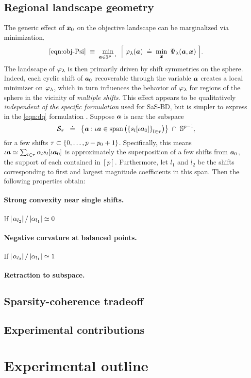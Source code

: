 \documentclass{article}
\numberwithin{equation}{section}
\begin{document}
\subsection{Regional landscape geometry}
The generic effect of $\boldsymbol{x}_0$ on the objective landscape can be marginalized via minimization,
\begin{equation} \label{eqn:obj-phi}
  \eqref{eqn:obj-Psi} \;\equiv\; \min_{\boldsymbol{a} \in \mathbb{S}^{p-1}} \;\Big[\;
    \varphi_\lambda(\boldsymbol{a}) \;\doteq\; \min_{\boldsymbol{x}}\; \Psi_\lambda(\boldsymbol{a}, \boldsymbol{x})
  \;\Big].
\end{equation}
The landscape of $\varphi_\lambda$ is then primarily driven by shift symmetries on the sphere. Indeed, each cyclic shift of $\boldsymbol{a}_0$ recoverable through the variable $\boldsymbol{a}$ creates a local minimizer on $\varphi_\lambda$, which in turn influences the behavior of $\varphi_\lambda$ for regions of the sphere in the vicinity of {\em multiple shifts}.
This effect appears to be qualitatively {\em independent of the specific formulation} used for SaS-BD, but is simpler to express in the \eqref{eqn:dq} formulation \cite{kuo2019geometry}. Suppose $\boldsymbol{a}$ is near the subspace
\begin{equation}
  \mathcal{S}_\tau \;\;\doteq\;\; \left\{ \boldsymbol{a}: \iota\boldsymbol{a} \in \text{span}\left( \left\{ s_l[\iota\boldsymbol{a}_0]\right\}_{l\in\tau}\right)\right\} \;\cap\; \mathbb{S}^{p-1},
\end{equation}
for a few shifts $\tau\subset\left\{ 0,\dots,p-p_0+1\right\}$. Specifically, this means $\iota\boldsymbol{a} \simeq \textstyle \sum_{l\in\tau} \alpha_l s_l[\iota\boldsymbol{a}_0]$ is approximately the superposition of a few shifts from $\boldsymbol{a}_0$, the support of each contained in $[p]$. Furthermore, let $l_1$ and $l_2$ be the shifts corresponding to first and largest magnitude coefficients in this span. Then the following properties obtain:

\paragraph{Strong convexity near single shifts.} If $\left\lvert \alpha_{l_2}\right\rvert/\left\lvert \alpha_{l_1}\right\rvert \simeq 0$
\paragraph{Negative curvature at balanced points.} If $\left\lvert \alpha_{l_2}\right\rvert/\left\lvert \alpha_{l_1}\right\rvert \simeq 1$
\paragraph{Retraction to subspace.}

\subsection{Sparsity-coherence tradeoff}


\subsection{Experimental contributions}

\section{Experimental outline}

{\small


}
\end{document}
